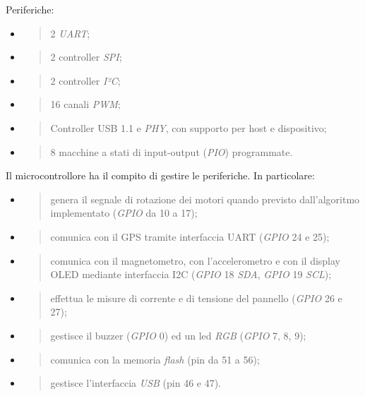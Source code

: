 Periferiche:

\begin{itemize}
\item
  \begin{quote}
  2 \emph{UART};
  \end{quote}
\item
  \begin{quote}
  2 controller \emph{SPI};
  \end{quote}
\item
  \begin{quote}
  2 controller \emph{I²C};
  \end{quote}
\item
  \begin{quote}
  16 canali \emph{PWM};
  \end{quote}
\item
  \begin{quote}
  Controller USB 1.1 e \emph{PHY}, con supporto per host e dispositivo;
  \end{quote}
\item
  \begin{quote}
  8 macchine a stati di input-output (\emph{PIO}) programmate.
  \end{quote}
\end{itemize}

Il microcontrollore ha il compito di gestire le periferiche. In
particolare:

\begin{itemize}
\item
  \begin{quote}
  genera il segnale di rotazione dei motori quando previsto
  dall'algoritmo implementato (\emph{GPIO} da 10 a 17);
  \end{quote}
\item
  \begin{quote}
  comunica con il GPS tramite interfaccia UART (\emph{GPIO} 24 e 25);
  \end{quote}
\item
  \begin{quote}
  comunica con il magnetometro, con l'accelerometro e con il display
  OLED mediante interfaccia I2C (\emph{GPIO} 18 \emph{SDA}, \emph{GPIO}
  19 \emph{SCL});
  \end{quote}
\item
  \begin{quote}
  effettua le misure di corrente e di tensione del pannello (\emph{GPIO}
  26 e 27);
  \end{quote}
\item
  \begin{quote}
  gestisce il buzzer (\emph{GPIO} 0) ed un led \emph{RGB} (\emph{GPIO}
  7, 8, 9);
  \end{quote}
\item
  \begin{quote}
  comunica con la memoria \emph{flash} (pin da 51 a 56);
  \end{quote}
\item
  \begin{quote}
  gestisce l'interfaccia \emph{USB} (pin 46 e 47).
  \end{quote}
\end{itemize}

